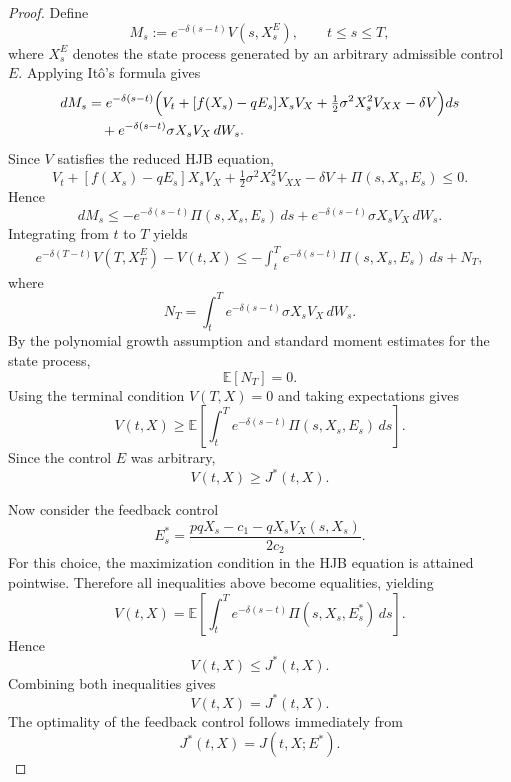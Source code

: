 \documentclass[11pt]{article}
\begin{document}
	\begin{proof}
		Define
		\[
		M_s
		:=
		e^{-\delta(s-t)}
		V(s,X_s^{E}),
		\qquad
		t\le s\le T,
		\]
		where $X_s^{E}$ denotes the state process generated by an arbitrary admissible control $E$. Applying It\^o's formula gives
		\[
		\begin{aligned}
			dM_s
			&=
			e^{-\delta(s-t)}
			\Bigl(
			V_t
			+
			[f(X_s)-qE_s]X_sV_X
			+
			\tfrac12\sigma^2X_s^2V_{XX}
			-\delta V
			\Bigr)ds
			\\
			&\quad
			+
			e^{-\delta(s-t)}
			\sigma X_sV_X\,dW_s .
		\end{aligned}
		\]
		Since $V$ satisfies the reduced HJB equation,
		\[
		V_t
		+
		[f(X_s)-qE_s]X_sV_X
		+
		\tfrac12\sigma^2X_s^2V_{XX}
		-\delta V
		+
		\Pi(s,X_s,E_s)
		\le 0.
		\]
		Hence
		\[
		dM_s
		\le
		-e^{-\delta(s-t)}
		\Pi(s,X_s,E_s)\,ds
		+
		e^{-\delta(s-t)}
		\sigma X_sV_X\,dW_s .
		\]
		Integrating from $t$ to $T$ yields
		\[
		\begin{aligned}
			e^{-\delta(T-t)}V(T,X_T^E)-V(t,X)
			\le
			-\int_t^T
			e^{-\delta(s-t)}
			\Pi(s,X_s,E_s)\,ds
			+
			N_T,
		\end{aligned}
		\]
		where
		\[
		N_T
		=
		\int_t^T
		e^{-\delta(s-t)}
		\sigma X_sV_X\,dW_s.
		\]
		By the polynomial growth assumption and standard moment estimates for the state process,
		\[
		\mathbb{E}[N_T]=0.
		\]
		Using the terminal condition $V(T,X)=0$ and taking expectations gives
		\[
		V(t,X)
		\ge
		\mathbb{E}
		\left[
		\int_t^T
		e^{-\delta(s-t)}
		\Pi(s,X_s,E_s)\,ds
		\right].
		\]
		Since the control $E$ was arbitrary,
		\[
		V(t,X)\ge J^*(t,X).
		\]
		
		Now consider the feedback control
		\[
		E_s^*
		=
		\frac{pqX_s-c_1-qX_sV_X(s,X_s)}{2c_2}.
		\]
		For this choice, the maximization condition in the HJB equation is attained pointwise. Therefore all inequalities above become equalities, yielding
		\[
		V(t,X)
		=
		\mathbb{E}
		\left[
		\int_t^T
		e^{-\delta(s-t)}
		\Pi(s,X_s,E_s^*)\,ds
		\right].
		\]
		Hence
		\[
		V(t,X)
		\le
		J^*(t,X).
		\]
		Combining both inequalities gives
		\[
		V(t,X)=J^*(t,X).
		\]
		The optimality of the feedback control follows immediately from
		\[
		J^*(t,X)
		=
		J(t,X;E^*).
		\]
	\end{proof}
	
\end{document}
